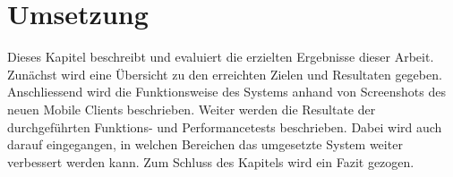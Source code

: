 \section{Umsetzung}

Dieses Kapitel beschreibt und evaluiert die erzielten Ergebnisse dieser Arbeit.
Zunächst wird eine Übersicht zu den erreichten Zielen und Resultaten gegeben.
Anschliessend wird die Funktionsweise des Systems anhand von Screenshots des neuen Mobile Clients beschrieben.
Weiter werden die Resultate der durchgeführten Funktions- und Performancetests beschrieben.
Dabei wird auch darauf eingegangen, in welchen Bereichen das umgesetzte System weiter verbessert werden kann.
Zum Schluss des Kapitels wird ein Fazit gezogen.





\clearpage
